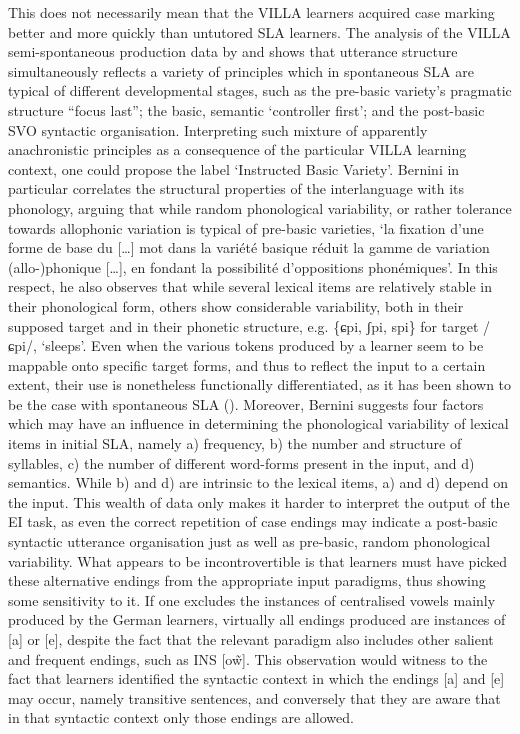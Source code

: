 This does not necessarily mean that the VILLA learners acquired case marking better and more quickly than untutored SLA learners. The analysis of the VILLA semi-spontaneous production data by \citet{Bernini2016} and \citet{Dimroth2018} shows that utterance structure simultaneously reflects a variety of principles which in spontaneous SLA are typical of different developmental stages, such as the pre-basic variety’s pragmatic structure ``focus last''; the basic, semantic ‘controller first’; and the post-basic SVO syntactic organisation. Interpreting such mixture of apparently anachronistic principles as a consequence of the particular VILLA learning context, one could propose the label ‘Instructed Basic Variety’. Bernini in particular correlates the structural properties of the interlanguage with its phonology, arguing that while random phonological variability, or rather tolerance towards allophonic variation is typical of pre-basic varieties, ‘la fixation d’une forme de base du […] mot dans la variété basique réduit la gamme de variation (allo-)phonique […], en fondant la possibilité d’oppositions phonémiques’. In this respect, he also observes that while several lexical items are relatively stable in their phonological form, others show considerable variability, both in their supposed target and in their phonetic structure, e.g. \{ɕpi, ʃpi, spi\} for target /ɕpi/, ‘sleeps’. Even when the various tokens produced by a learner seem to be mappable onto specific target forms, and thus to reflect the input to a certain extent, their use is nonetheless functionally differentiated, as it has been shown to be the case with spontaneous SLA (\citealt{BroederEtAl1993}). Moreover, Bernini suggests four factors which may have an influence in determining the phonological variability of lexical items in initial SLA, namely a) frequency, b) the number and structure of syllables, c) the number of different word-forms present in the input, and d) semantics. While b) and d) are intrinsic to the lexical items, a) and d) depend on the input. This wealth of data only makes it harder to interpret the output of the EI task, as even the correct repetition of case endings may indicate a post-basic syntactic utterance organisation just as well as pre-basic, random phonological variability. What appears to be incontrovertible is that learners must have picked these alternative endings from the appropriate input paradigms, thus showing some sensitivity to it. If one excludes the instances of centralised vowels mainly produced by the German learners, virtually all endings produced are instances of [a] or [e], despite the fact that the relevant paradigm also includes other salient and frequent endings, such as INS [o\~{w}]. This observation would witness to the fact that learners identified the syntactic context in which the endings [a] and [e] may occur, namely transitive sentences, and conversely that they are aware that in that syntactic context only those endings are allowed.

